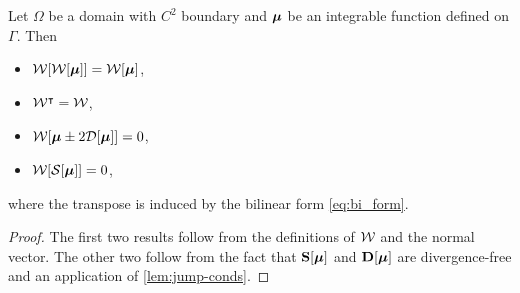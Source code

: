 \begin{lem}
  Let $\Omega$ be a domain with $C^2$ boundary and ${\boldsymbol \mu}$ be
  an integrable function defined on $\Gamma$. Then
  \begin{itemize}
  \item ${\mathcal W}[{\mathcal W}[{\boldsymbol \mu}]] = {\mathcal W}[{\boldsymbol \mu}]$,
  \item ${\mathcal W}^\intercal = {\mathcal W}$,
  \item ${\mathcal W}[{\boldsymbol \mu} \pm 2 {\mathcal D}[{\boldsymbol \mu}]] = 0$,
  \item ${\mathcal W}[{\mathcal S}[{\boldsymbol \mu}]] = 0$,
  \end{itemize}
  where the transpose is induced by the bilinear
  form \cref{eq:bi_form}.
\end{lem}

\begin{proof}
  The first two results follow from the definitions of ${\mathcal W}$ and
  the normal vector. The other two follow from the fact that
  ${\bf S}[{\boldsymbol \mu}]$ and ${\bf D}[{\boldsymbol \mu}]$ are divergence-free and
  an application of \cref{lem:jump-conds}.
\end{proof}
